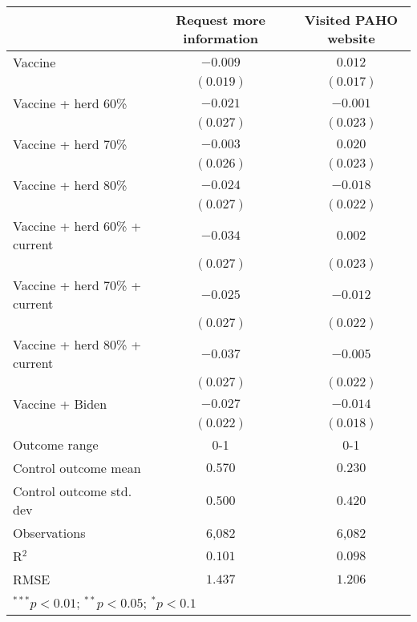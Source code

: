 \begin{table}
\begin{center}
\begin{tabular}{l c c}
\hline
 & Request more information & Visited PAHO website \\
\hline
Vaccine                       & $-0.009$  & $0.012$   \\
                              & $(0.019)$ & $(0.017)$ \\
Vaccine + herd 60\%           & $-0.021$  & $-0.001$  \\
                              & $(0.027)$ & $(0.023)$ \\
Vaccine + herd 70\%           & $-0.003$  & $0.020$   \\
                              & $(0.026)$ & $(0.023)$ \\
Vaccine + herd 80\%           & $-0.024$  & $-0.018$  \\
                              & $(0.027)$ & $(0.022)$ \\
Vaccine + herd 60\% + current & $-0.034$  & $0.002$   \\
                              & $(0.027)$ & $(0.023)$ \\
Vaccine + herd 70\% + current & $-0.025$  & $-0.012$  \\
                              & $(0.027)$ & $(0.022)$ \\
Vaccine + herd 80\% + current & $-0.037$  & $-0.005$  \\
                              & $(0.027)$ & $(0.022)$ \\
Vaccine + Biden               & $-0.027$  & $-0.014$  \\
                              & $(0.022)$ & $(0.018)$ \\
\hline
Outcome range                 & 0-1       & 0-1       \\
Control outcome mean          & $0.570$   & $0.230$   \\
Control outcome std. dev      & $0.500$   & $0.420$   \\
Observations                  & 6,082     & 6,082     \\
R$^{2}$                       & $0.101$   & $0.098$   \\
RMSE                          & $1.437$   & $1.206$   \\
\hline
\multicolumn{3}{l}{\scriptsize{$^{***}p<0.01$; $^{**}p<0.05$; $^{*}p<0.1$}}
\end{tabular}
\caption{}
\label{table:SI_table27_allinfo_pooled_behav}
\end{center}
\end{table}
